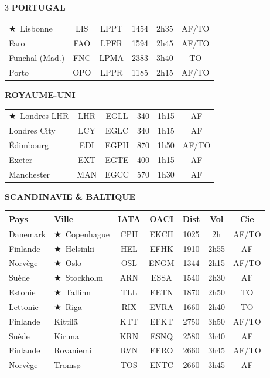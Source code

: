 \documentclass[9pt,a4paper,landscape]{article}
\newcommand{\CAP}{\textcolor{capgold}{$\bigstar$}}
\begin{document}
\begin{multicols}{3}
\vspace{0.15cm}
\textbf{\color{eurblue}PORTUGAL}\\[-0.1cm]
\begin{tabular}{@{}l c c c c c@{}}
\toprule
\rowcolor{eurlight}\CAP\ Lisbonne & LIS & LPPT & 1454 & 2h35 & AF/TO \\
Faro & FAO & LPFR & 1594 & 2h45 & AF/TO \\
\rowcolor{eurlight} Funchal (Mad.) & FNC & LPMA & 2383 & 3h40 & TO \\
Porto & OPO & LPPR & 1185 & 2h15 & AF/TO \\
\bottomrule
\end{tabular}

\vspace{0.15cm}
\textbf{\color{eurblue}ROYAUME-UNI}\\[-0.1cm]
\begin{tabular}{@{}l c c c c c@{}}
\toprule
\rowcolor{eurlight}\CAP\ Londres LHR & LHR & EGLL & 340 & 1h15 & AF \\
Londres City & LCY & EGLC & 340 & 1h15 & AF \\
\rowcolor{eurlight} Édimbourg & EDI & EGPH & 870 & 1h50 & AF/TO \\
Exeter & EXT & EGTE & 400 & 1h15 & AF \\
\rowcolor{eurlight} Manchester & MAN & EGCC & 570 & 1h30 & AF \\
\bottomrule
\end{tabular}

\vspace{0.15cm}
\textbf{\color{eurblue}SCANDINAVIE \& BALTIQUE}\\[-0.1cm]
\begin{tabular}{@{}l l c c c c c@{}}
\toprule
\textbf{Pays} & \textbf{Ville} & \textbf{IATA} & \textbf{OACI} & \textbf{Dist} & \textbf{Vol} & \textbf{Cie} \\
\midrule
\rowcolor{eurlight} Danemark & \CAP\ Copenhague & CPH & EKCH & 1025 & 2h & AF/TO \\
Finlande & \CAP\ Helsinki & HEL & EFHK & 1910 & 2h55 & AF \\
\rowcolor{eurlight} Norvège & \CAP\ Oslo & OSL & ENGM & 1344 & 2h15 & AF/TO \\
Suède & \CAP\ Stockholm & ARN & ESSA & 1540 & 2h30 & AF \\
\rowcolor{eurlight} Estonie & \CAP\ Tallinn & TLL & EETN & 1870 & 2h50 & TO \\
Lettonie & \CAP\ Riga & RIX & EVRA & 1660 & 2h40 & TO \\
\rowcolor{eurlight} Finlande & Kittilä & KTT & EFKT & 2750 & 3h50 & AF/TO \\
Suède & Kiruna & KRN & ESNQ & 2580 & 3h40 & AF \\
\rowcolor{eurlight} Finlande & Rovaniemi & RVN & EFRO & 2660 & 3h45 & AF/TO \\
Norvège & Tromsø & TOS & ENTC & 2660 & 3h45 & AF \\
\bottomrule
\end{tabular}


\end{multicols}
\end{document}
